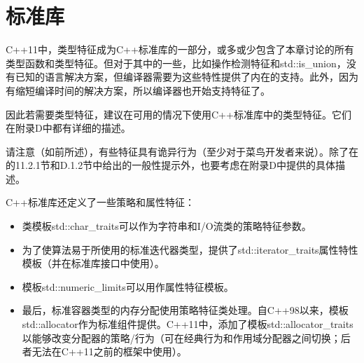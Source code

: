 \section{标准库}
C++11中，类型特征成为C++标准库的一部分，或多或少包含了本章讨论的所有类型函数和类型特征。但对于其中的一些，比如操作检测特征和std::is\_union，没有已知的语言解决方案，但编译器需要为这些特性提供了内在的支持。此外，因为有缩短编译时间的解决方案，所以编译器也开始支持特征了。

因此若需要类型特征，建议在可用的情况下使用C++标准库中的类型特征。它们在附录D中都有详细的描述。

请注意（如前所述），有些特征具有诡异行为（至少对于菜鸟开发者来说）。除了在的11.2.1节和D.1.2节中给出的一般性提示外，也要考虑在附录D中提供的具体描述。

C++标准库还定义了一些策略和属性特征：

\begin{itemize}
\item 
类模板std::char\_traits可以作为字符串和I/O流类的策略特征参数。

\item 
为了使算法易于所使用的标准迭代器类型，提供了std::iterator\_traits属性特性模板（并在标准库接口中使用）。

\item 
模板std::numeric\_limits可以用作属性特征模板。

\item 
最后，标准容器类型的内存分配使用策略特征类处理。自C++98以来，模板std::allocator作为标准组件提供。C++11中，添加了模板std::allocator\_traits以能够改变分配器的策略/行为（可在经典行为和作用域分配器之间切换；后者无法在C++11之前的框架中使用）。
\end{itemize}



































